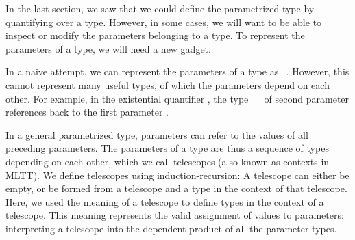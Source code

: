 In the last section, we saw that we could define the parametrized type  by quantifying over a type. However, in some cases, we will want to be able to inspect or modify the parameters belonging to a type. %
To represent the parameters of a type, we will need a new gadget.

In a naive attempt, we can represent the parameters of a type as \ . However, this cannot represent many useful types, of which the parameters depend on each other. For example, in the existential quantifier , the type \ \  of second parameter  references back to the first parameter .

In a general parametrized type, parameters can refer to the values of all preceding parameters. The parameters of a type are thus a sequence of types depending on each other, which we call telescopes \cite{practgen, sijsling, telescopes} (also known as contexts in MLTT). We define telescopes using induction-recursion:
A telescope can either be empty, or be formed from a telescope and a type in the context of that telescope. Here, we used the meaning of a telescope  to define types in the context of a telescope. This meaning represents the valid assignment of values to parameters:
interpreting a telescope into the dependent product of all the parameter types.

